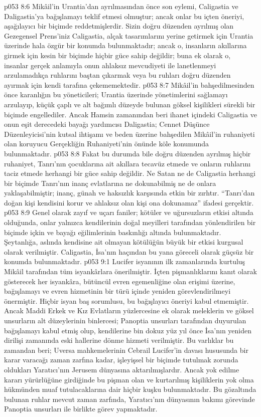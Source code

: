 \vs p053 8:6 Mikâil’in Urantia’dan ayrılmasından önce son eylemi, Caligastia ve Daligastia’ya bağışlamayı teklif etmesi olmuştur; ancak onlar bu içten öneriyi, aşağılayıcı bir biçimde reddetmişlerdir. Sizin doğru düzenden ayrılmış olan Gezegensel Prens’iniz Caligastia, alçak tasarımlarını yerine getirmek için Urantia üzerinde hala özgür bir konumda bulunmaktadır; ancak o, insanların akıllarına girmek için kesin bir biçimde hiçbir güce sahip değildir; buna ek olarak o, insanlar gerçek anlamıyla onun ahlaksız mevcudiyeti ile lanetlenmeyi arzulamadıkça ruhlarını baştan çıkarmak veya bu ruhları doğru düzenden ayırmak için kendi tarafına çekememektedir.
\vs p053 8:7 Mikâil’in bahşedilmesinden önce karanlığın bu yöneticileri; Urantia üzerinde yönetimlerini sağlamayı arzulayıp, küçük çaplı ve alt bağımlı düzeyde bulunan göksel kişilikleri sürekli bir biçimde engellediler. Ancak Hamsin zamanından beri ihanet içindeki Caligastia ve onun eşit derecedeki bayağı yardımcısı Daligastia; Cennet Düşünce Düzenleyicisi’nin kutsal ihtişamı ve beden üzerine bahşedilen Mikâil’in ruhaniyeti olan koruyucu Gerçekliğin Ruhaniyeti’nin önünde köle konumunda bulunmaktadır.
\vs p053 8:8 Fakat bu durumda bile doğru düzenden ayrılmış hiçbir ruhaniyet, Tanrı’nın çocuklarına ait akıllara tecavüz etmede ve onların ruhlarını taciz etmede herhangi bir güce sahip değildir. Ne Satan ne de Caligastia herhangi bir biçimde Tanrı’nın inanç evlatlarına ne dokunabilmiş ne de onlara yaklaşabilmiştir; inanç, günah ve haksızlık karşısında etkin bir zırhtır. “Tanrı’dan doğan kişi kendisini korur ve ahlaksız olan kişi ona dokunamaz” ifadesi gerçektir.
\vs p053 8:9 Genel olarak zayıf ve uçarı faniler; kötüler ve uğursuzların etkisi altında olduğunda, onlar yalnızca kendilerinin doğal meyilleri tarafından yönlendirilen bir biçimde içkin ve bayağı eğilimlerinin baskınlığı altında bulunmaktadır. Şeytanlığa, aslında kendisine ait olmayan kötülüğün büyük bir etkisi kurgusal olarak verilmiştir. Caligastia, İsa’nın haçından bu yana göreceli olarak güçsüz bir konumda bulunmaktadır.
\vs p053 9:1 Lucifer isyanının ilk zamanlarında kurtuluş Mikâil tarafından tüm isyankârlara önerilmiştir. İçten pişmanlıklarını kanıt olarak gösterecek her isyankâra, bütüncül evren egemenliğine olan erişimi üzerine, bağışlamayı ve evren hizmetinin bir türü içinde yeniden görevlendirilmeyi önermiştir. Hiçbir isyan baş sorumlusu, bu bağışlayıcı öneriyi kabul etmemiştir. Ancak Maddi Erkek ve Kız Evlatların yüzlercesine ek olarak meleklerin ve göksel unsurların alt düzeylerinin binlercesi; Panoptia unsurları tarafından duyurulan bağışlamayı kabul etmiş olup, kendilerine bin dokuz yüz yıl önce İsa’nın yeniden dirilişi zamanında eski hallerine dönme hizmeti verilmiştir. Bu varlıklar bu zamandan beri; Uversa mahkemelerinin Cebrail  Lucifer’in davası hususunda bir karar varacağı zaman zarfına kadar, işleyişsel bir biçimde tutulmak zorunda oldukları Yaratıcı’nın Jerusem dünyasına aktarılmışlardır. Ancak yok edilme kararı yürürlüğüne girdiğinde bu pişman olan ve kurtarılmış kişiliklerin yok olma hükmünden muaf tutulacaklarına dair hiçbir kuşku bulunmaktadır. Bu gözaltında bulunan ruhlar mevcut zaman zarfında, Yaratıcı’nın dünyasının bakımı görevinde Panoptia unsurları ile birlikte görev yapmaktadır.
